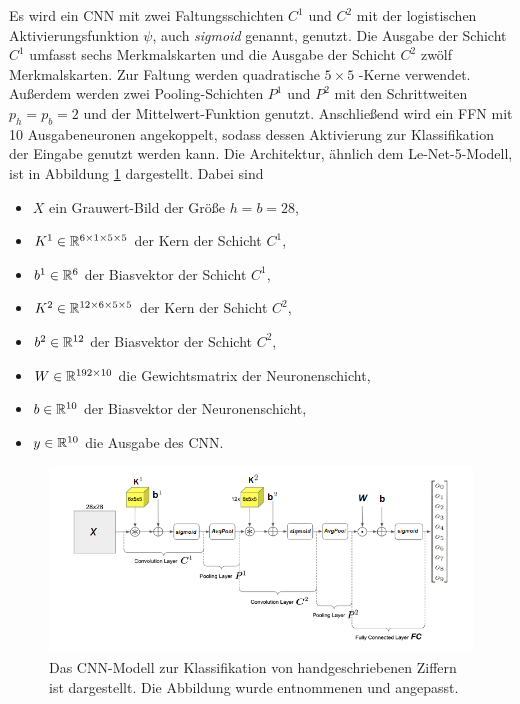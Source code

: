 Es wird ein CNN mit zwei Faltungsschichten $C^1$ und $C^2$ mit der logistischen Aktivierungsfunktion $\psi$, auch \textit{sigmoid} genannt, genutzt. Die Ausgabe der Schicht $C^1$ umfasst sechs Merkmalskarten und die Ausgabe der Schicht $C^2$ zwölf Merkmalskarten. Zur Faltung werden quadratische $5 \times 5$ -Kerne verwendet. Außerdem werden zwei Pooling-Schichten $P^1$ und $P^2$ mit den Schrittweiten $p_h=p_b=2$ und der Mittelwert-Funktion genutzt. Anschließend wird ein FFN mit 10 Ausgabeneuronen angekoppelt, sodass dessen Aktivierung zur Klassifikation der Eingabe genutzt werden kann. Die Architektur, ähnlich dem Le-Net-5-Modell\cite{DBLP:journals/pieee/LeCunBBH98}, ist in Abbildung \ref{modell} dargestellt. Dabei sind

\begin{itemize}
    \item $X$ ein Grauwert-Bild der Größe $h=b=28$,
    \item $K^1 \in \mathbb{R}^{6 \times 1 \times 5 \times 5}$ der Kern der Schicht $C^1$,
    \item $b^1 \in \mathbb{R}^6$ der Biasvektor der Schicht $C^1$,
    \item $K^2 \in \mathbb{R}^{12 \times 6 \times 5 \times 5}$ der Kern der Schicht $C^2$,
    \item $b^2 \in \mathbb{R}^{12}$ der Biasvektor der Schicht $C^2$,
    \item $W \in \mathbb{R}^{192 \times 10}$ die Gewichtsmatrix der Neuronenschicht,
    \item $b \in \mathbb{R}^{10}$ der Biasvektor der Neuronenschicht,
    \item $y \in \mathbb{R}^{10}$ die Ausgabe des CNN. 
\end{itemize}

\begin{figure}[h]
    \includegraphics[width=1.0\textwidth]{pics/chapters/CCN/modell_arch_anp.png}
    \centering
    \caption[Das in dieser Arbeit verwendete CNN-Modell]{Das CNN-Modell zur Klassifikation von handgeschriebenen Ziffern ist dargestellt. Die Abbildung wurde \cite{gentle} entnommenen und angepasst.}
    \label{modell}
\end{figure}

